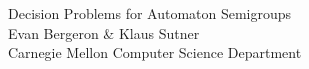 \documentclass[a0,16pt]{a0poster}
\newcommand*{\concourse}{}
\theoremstyle{pleasant}
\newcommand{\0}{\underline{0}}
\newcommand{\1}{\underline{1}}
\newcommand{\2}{\underline{2}}
\begin{document}


\begin{minipage}[b]{0.55\linewidth}
\veryHuge \color{NavyBlue} \concourse{Decision Problems for Automaton Semigroups} \color{Black}\\ %
\huge \concourse{Evan Bergeron \& Klaus Sutner}\\ %
\huge Carnegie Mellon Computer Science Department\\ %
\end{minipage}



\end{document}

